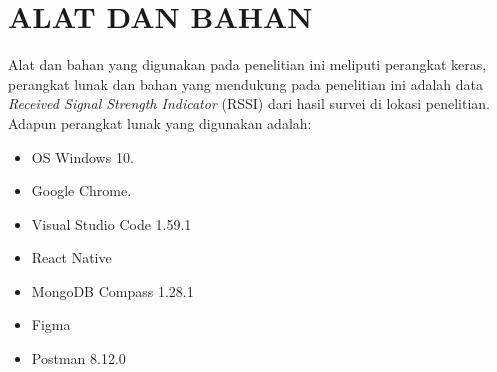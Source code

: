 
\section{\uppercase{ALAT DAN BAHAN}}
Alat dan bahan yang digunakan pada penelitian ini meliputi perangkat keras, perangkat lunak dan bahan yang mendukung pada penelitian ini adalah data \textit{Received Signal Strength Indicator} (RSSI) dari hasil survei di lokasi penelitian. Adapun perangkat lunak yang digunakan adalah:
\begin{itemize}
	\itemsep0em
	\item OS Windows 10.
	\item Google Chrome.
	\item Visual Studio Code 1.59.1
	\item React Native
	\item MongoDB Compass 1.28.1
	\item Figma
	\item Postman 8.12.0
\end{itemize}

